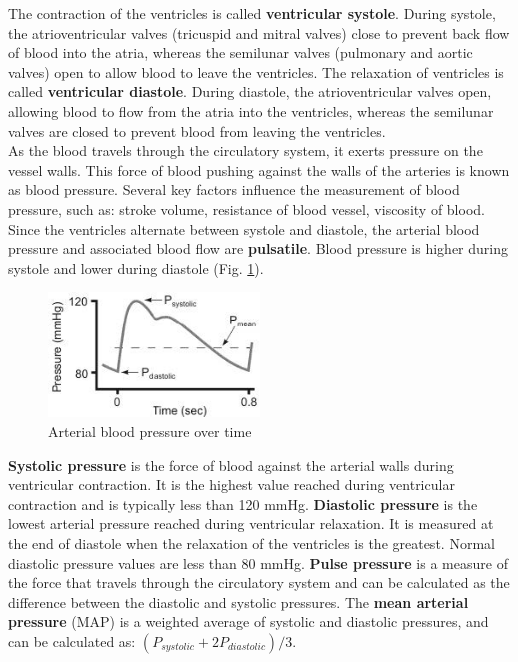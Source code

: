\documentclass{article}
\begin{document}
The contraction of the ventricles is called \textbf{ventricular systole}. During systole, the atrioventricular valves (tricuspid and mitral valves) close to prevent back flow of blood into the atria, whereas the semilunar valves (pulmonary and aortic valves) open to allow blood to leave the ventricles. The relaxation of ventricles is called \textbf{ventricular diastole}. During diastole, the atrioventricular valves open, allowing blood to flow from the atria into the ventricles, whereas the semilunar valves are closed to prevent blood from leaving the ventricles.\\

As the blood travels through the circulatory system, it exerts pressure on the vessel walls. This force of blood pushing against the walls of the arteries is known as blood pressure. Several key factors influence the measurement of blood pressure, such as: stroke volume, resistance of blood vessel, viscosity of blood. Since the ventricles alternate between systole and diastole, the arterial blood pressure and associated blood flow are \textbf{pulsatile}. Blood pressure is higher during systole and lower during diastole (Fig. \ref{systole}).

\begin{figure}[h]
\centering\includegraphics[width=0.5\textwidth]{../images/BP_2.jpg}
\caption{Arterial blood pressure over time}
\label{systole}
\end{figure}

\textbf{Systolic pressure} is the force of blood against the arterial walls during ventricular contraction. It is the highest value reached during ventricular contraction and is typically less than 120 mmHg. \textbf{Diastolic pressure} is the lowest arterial pressure reached during ventricular relaxation. It is measured at the end of diastole when the relaxation of the ventricles is the greatest. Normal diastolic pressure values are less than 80 mmHg. \textbf{Pulse pressure} is a measure of the force that travels through the circulatory system and can be calculated as the difference between the diastolic and systolic pressures. The \textbf{mean arterial pressure} (MAP) is a weighted average of systolic and diastolic pressures, and can be calculated as: $(P_{systolic} + 2P_{diastolic})/3$.\\
\end{document}
